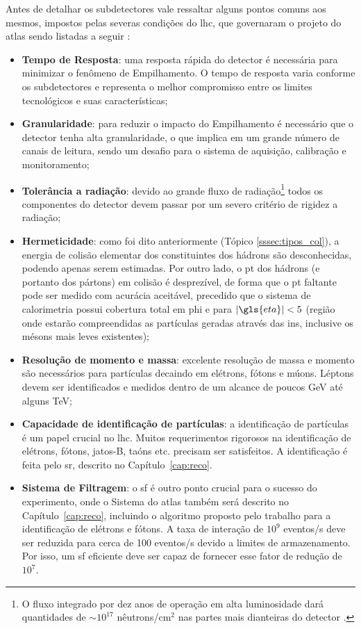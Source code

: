 Antes de detalhar os subdetectores vale ressaltar alguns pontos comuns aos
mesmos, impostos pelas severas condições do \gls{lhc}, que 
governaram o projeto do \gls{atlas} sendo listadas a seguir \cite{THESIS_LAR}:



\begin{itemize}
\item \textbf{Tempo de Resposta}: uma resposta rápida do detector é necessária
para minimizar o fenômeno de Empilhamento. O tempo de resposta varia conforme os
subdetectores e representa o melhor compromisso entre os limites tecnológicos e
suas características;
\item \textbf{Granularidade}: para reduzir o impacto do Empilhamento é
necessário que o detector tenha alta granularidade, o que implica em um grande
número de canais de leitura, sendo um desafio para o sistema de aquisição,
calibração e monitoramento;
\item \textbf{Tolerância a radiação}: devido ao grande fluxo de
radiação\footnote{O fluxo integrado por dez anos de operação em alta
luminosidade dará quantidades de $\sim 10^{17}$ nêutrons/$\text{cm}^2$ nas partes 
mais dianteiras do detector \cite{THESIS_LAR}.} todos os componentes do detector devem passar por 
um severo critério de rigidez a radiação;
\item \textbf{Hermeticidade}: como foi dito anteriormente (Tópico
\ref{sssec:tipos_col}), a energia de colisão elementar dos 
constituintes dos hádrons são desconhecidas, podendo apenas serem estimadas. 
Por outro lado, o \gls{pt} dos hádrons (e portanto dos pártons) 
em colisão é desprezível, de forma que o \acrlong{pt}
faltante pode ser medido com acurácia aceitável, precedido que o sistema de
calorimetria possui cobertura total em \gls{phi} e para $|\gls{eta}|<5$
(região onde estarão compreendidas as partículas geradas através das \glspl{in}, 
inclusive os mésons mais leves existentes);
\item \textbf{Resolução de momento e massa}: excelente resolução de massa e
momento são necessários para partículas decaindo em elétrons, fótons e múons.
Léptons devem ser identificados e medidos dentro de um alcance de poucos GeV até
alguns TeV;
\item \textbf{Capacidade de identificação de partículas}: a identificação de
partículas é um papel crucial no \gls{lhc}. Muitos requerimentos rigorosos na
identificação de elétrons, fótons, jatos-B, taóns etc. precisam ser satisfeitos.
A identificação é feita pelo \glsdesc{sr}, descrito no
Capítulo~\ref{cap:reco}.
\item \textbf{Sistema de Filtragem}: o \glsdesc{sf} é outro ponto
crucial para o sucesso do experimento, onde o Sistema do \gls{atlas} também 
será descrito no Capítulo~\ref{cap:reco}, incluindo o algoritmo proposto pelo trabalho para a
identificação de elétrons e fótons. 
A taxa de interação de $10^9$ eventos/s deve ser reduzida para cerca de 
100 eventos/s devido a limites de armazenamento.
Por isso, um \glsdesc{sf} eficiente deve ser capaz de fornecer esse
fator de redução de $10^7$.  
\end{itemize}

